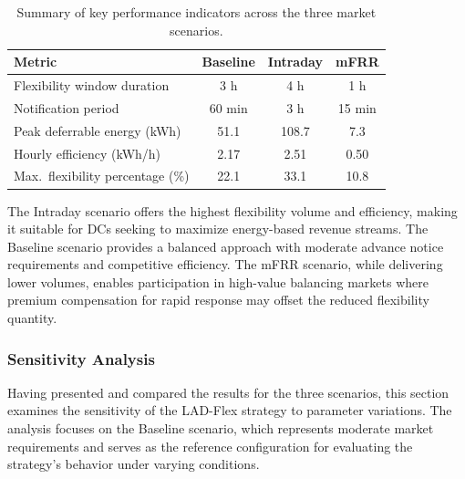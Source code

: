 \documentclass[preprint,12pt]{elsarticle}
\begin{document}
\begin{table}[h!]
\centering
\renewcommand{\arraystretch}{1.2}
\begin{tabular}{@{}lccc@{}}
\toprule
\textbf{Metric} & \textbf{Baseline} & \textbf{Intraday} & \textbf{mFRR} \\
\midrule
Flexibility window duration & 3 h & 4 h & 1 h \\
Notification period & 60 min & 3 h & 15 min \\
Peak deferrable energy (kWh) & 51.1 & 108.7 & 7.3 \\
Hourly efficiency (kWh/h) & 2.17 & 2.51 & 0.50 \\
Max.\ flexibility percentage (\%) & 22.1 & 33.1 & 10.8 \\
\bottomrule
\end{tabular}
\caption{Summary of key performance indicators across the three market scenarios.}
\label{tab:scenario_summary}
\end{table}

The Intraday scenario offers the highest flexibility volume and efficiency, making it suitable for DCs seeking to maximize energy-based revenue streams. The Baseline scenario provides a balanced approach with moderate advance notice requirements and competitive efficiency. The mFRR scenario, while delivering lower volumes, enables participation in high-value balancing markets where premium compensation for rapid response may offset the reduced flexibility quantity. 


































\subsubsection{Sensitivity Analysis} \label{sec:sensitivity}
Having presented and compared the results for the three scenarios, this section examines the sensitivity of the LAD-Flex strategy to parameter variations. The analysis focuses on the Baseline scenario, which represents moderate market requirements and serves as the reference configuration for evaluating the strategy's behavior under varying conditions.
\end{document}
